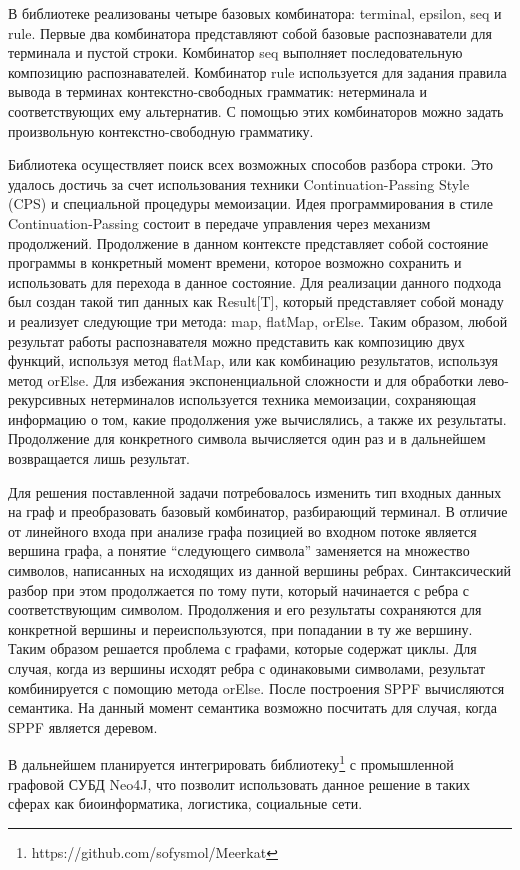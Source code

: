 \documentclass [a4paper] {article}
\begin{document}
В библиотеке реализованы четыре базовых комбинатора: terminal, epsilon, seq и rule. Первые два комбинатора представляют собой базовые распознаватели для терминала и пустой строки. Комбинатор seq выполняет последовательную композицию распознавателей. Комбинатор rule используется для задания правила вывода в терминах контекстно-свободных грамматик: нетерминала и соответствующих ему альтернатив. С помощью этих комбинаторов можно задать произвольную контекстно-свободную грамматику. 


Библиотека осуществляет поиск всех возможных способов разбора строки. Это удалось достичь за счет использования техники Continuation-Passing Style (CPS) и специальной процедуры мемоизации. Идея программирования в стиле Continuation-Passing состоит в передаче управления через механизм продолжений. Продолжение в данном контексте представляет собой состояние программы в конкретный момент времени, которое возможно сохранить и использовать для перехода в данное состояние. Для реализации данного подхода был создан такой тип данных как Result[T],  который представляет собой монаду и реализует следующие три метода: map, flatMap, orElse. Таким образом, любой результат работы распознавателя можно представить как композицию двух функций, используя метод flatMap, или как комбинацию результатов, используя метод orElse. Для избежания экспоненциальной сложности и для обработки лево-рекурсивных нетерминалов используется техника мемоизации, сохраняющая информацию о том, какие продолжения уже вычислялись, а также их результаты. Продолжение для конкретного символа вычисляется один раз и в дальнейшем возвращается лишь результат. 


Для решения поставленной задачи потребовалось изменить тип входных данных на граф и преобразовать базовый комбинатор, разбирающий терминал. В отличие от линейного входа при анализе графа позицией во входном потоке является вершина графа, а понятие ``следующего символа'' заменяется на множество символов, написанных на исходящих из данной вершины ребрах. Синтаксический разбор при этом продолжается по тому пути, который начинается с ребра с соответствующим символом. Продолжения и его результаты сохраняются для конкретной вершины и переиспользуются, при попадании в ту же вершину. Таким образом решается проблема с графами, которые содержат циклы.  Для случая, когда из вершины исходят ребра с одинаковыми символами, результат комбинируется с помощию метода orElse. После построения SPPF вычисляются семантика. На данный момент семантика возможно посчитать для случая, когда SPPF является деревом.


В дальнейшем планируется интегрировать библиотеку\footnote{https://github.com/sofysmol/Meerkat} с промышленной графовой СУБД Neo4J, что позволит использовать данное решение в таких сферах как биоинформатика,  логистика, социальные сети.

\printbibliography

\end{document}
